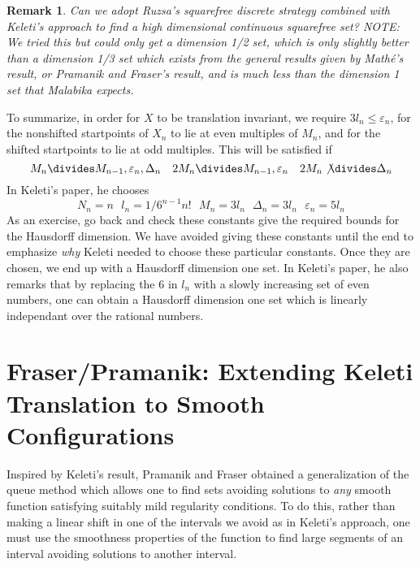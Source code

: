 \documentclass{report}
\theoremstyle{plain}
\theoremstyle{plain}
\newtheorem*{remark}{Remark}
\begin{document}
\begin{remark}
    Can we adopt Ruzsa's squarefree discrete strategy combined with Keleti's approach to find a high dimensional continuous squarefree set? NOTE: We tried this but could only get a dimension 1/2 set, which is only slightly better than a dimension 1/3 set which exists from the general results given by Math\'{e}'s result, or Pramanik and Fraser's result, and is much less than the dimension 1 set that Malabika expects.
\end{remark}

To summarize, in order for $X$ to be translation invariant, we require $3l_n \leq \varepsilon_n$, for the nonshifted startpoints of $X_n$ to lie at even multiples of $M_n$, and for the shifted startpoints to lie at odd multiples. This will be satisfied if
%
\[ M_n \divides M_{n-1}, \varepsilon_n, \Delta_n\ \ \ 2M_n \divides M_{n-1}, \varepsilon_n\ \ \ 2M_n \not \divides \Delta_n \]
%
In Keleti's paper, he chooses
%
\[ N_n = n\ \ \ l_n = 1/6^{n-1}n!\ \ \ M_n = 3l_n\ \ \ \Delta_n = 3l_n\ \ \ \varepsilon_n = 5l_n \]
%
As an exercise, go back and check these constants give the required bounds for the Hausdorff dimension. We have avoided giving these constants until the end to emphasize {\it why} Keleti needed to choose these particular constants. Once they are chosen, we end up with a Hausdorff dimension one set. In Keleti's paper, he also remarks that by replacing the 6 in $l_n$ with a slowly increasing set of even numbers, one can obtain a Hausdorff dimension one set which is linearly independant over the rational numbers.









\section{Fraser/Pramanik: Extending Keleti Translation to Smooth Configurations}

Inspired by Keleti's result, Pramanik and Fraser obtained a generalization of the queue method which allows one to find sets avoiding solutions to {\it any} smooth function satisfying suitably mild regularity conditions. To do this, rather than making a linear shift in one of the intervals we avoid as in Keleti's approach, one must use the smoothness properties of the function to find large segments of an interval avoiding solutions to another interval.
\end{document}
